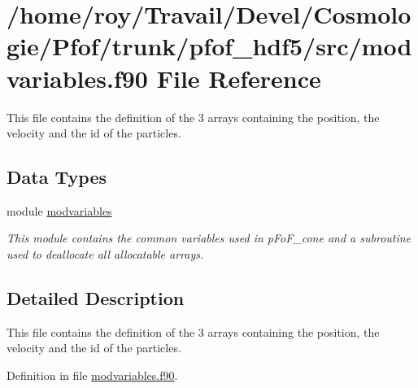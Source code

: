 \hypertarget{pfof__hdf5_2src_2modvariables_8f90}{\section{/home/roy/\-Travail/\-Devel/\-Cosmologie/\-Pfof/trunk/pfof\-\_\-hdf5/src/modvariables.f90 File Reference}
\label{pfof__hdf5_2src_2modvariables_8f90}
}


This file contains the definition of the 3 arrays containing the position, the velocity and the id of the particles.  


\subsection*{Data Types}
\begin{DoxyCompactItemize}
\item 
module \hyperlink{classmodvariables}{modvariables}
\begin{DoxyCompactList}\small\item\em This module contains the common variables used in p\-Fo\-F\-\_\-cone and a subroutine used to deallocate all allocatable arrays. \end{DoxyCompactList}\end{DoxyCompactItemize}


\subsection{Detailed Description}
This file contains the definition of the 3 arrays containing the position, the velocity and the id of the particles. 

Definition in file \hyperlink{pfof__hdf5_2src_2modvariables_8f90_source}{modvariables.\-f90}.

